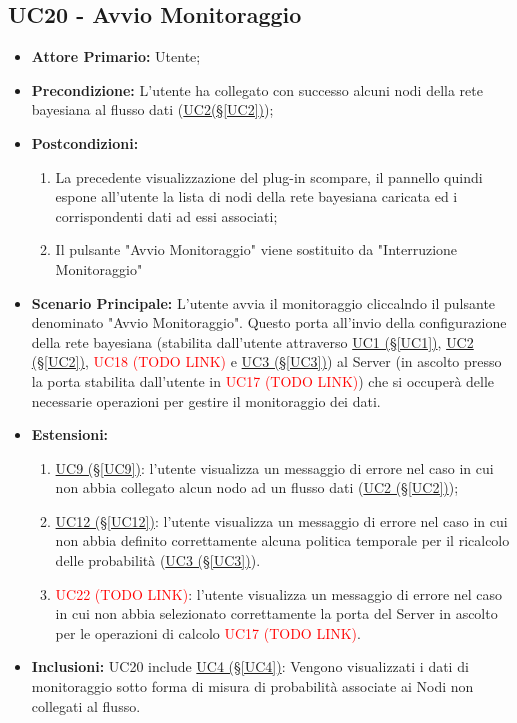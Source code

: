 \subsection{UC20 - Avvio Monitoraggio}\label{UC20}
\begin{itemize}
	\item \textbf{Attore Primario:} Utente;
	\item \textbf{Precondizione:} L'utente ha collegato con successo alcuni nodi della rete bayesiana al flusso dati (\hyperref[UC2]{UC2(§\ref*{UC2})});
	\item \textbf{Postcondizioni:} 
	\begin{enumerate}
		\item La precedente visualizzazione del plug-in scompare, il pannello quindi espone all'utente la lista di nodi della rete bayesiana caricata ed i corrispondenti dati ad essi associati;
		\item Il pulsante "Avvio Monitoraggio" viene sostituito da "Interruzione Monitoraggio"
	\end{enumerate}
	\item \textbf{Scenario Principale:} L'utente avvia il monitoraggio cliccalndo il pulsante denominato "Avvio Monitoraggio". Questo porta all'invio della configurazione della rete bayesiana (stabilita dall'utente attraverso \hyperref[UC1]{UC1 (§\ref*{UC1})}, \hyperref[UC2]{UC2 (§\ref*{UC2})}, \textcolor{red}{UC18 (TODO LINK)} e \hyperref[UC3]{UC3 (§\ref*{UC3})}) al Server (in ascolto presso la porta stabilita dall'utente in \textcolor{red}{UC17 (TODO LINK)}) che si occuperà delle necessarie operazioni per gestire il monitoraggio dei dati.
	\item \textbf{Estensioni:}
	\begin{enumerate}
		\item \hyperref[UC9]{UC9 (§\ref*{UC9})}: l'utente visualizza un messaggio di errore nel caso in cui non abbia collegato alcun nodo ad un flusso dati (\hyperref[UC2]{UC2 (§\ref*{UC2})});
		\item \hyperref[UC12]{UC12 (§\ref*{UC12})}: l'utente visualizza un messaggio di errore nel caso in cui non abbia definito correttamente alcuna politica temporale per il ricalcolo delle probabilità (\hyperref[UC3]{UC3 (§\ref*{UC3})}).
		\item \textcolor{red}{UC22 (TODO LINK)}: l'utente visualizza un messaggio di errore nel caso in cui non abbia selezionato correttamente la porta del Server in ascolto per le operazioni di calcolo \textcolor{red}{UC17 (TODO LINK)}.
	\end{enumerate}
	\item \textbf{Inclusioni:} UC20 include \hyperref[UC4]{UC4 (§\ref*{UC4})}: Vengono visualizzati i dati di monitoraggio sotto forma di misura di probabilità associate ai Nodi non collegati al flusso.
\end{itemize}

